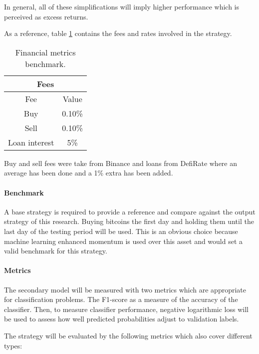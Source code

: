 In general, all of these simplifications will imply higher performance which is
perceived as excess returns.

As a reference, table \ref{table:benchmark_fees} contains the fees and rates involved in the strategy.

\begin{table}[H]
  \centering
  \begin{tabular}{| c | c |} 
    \hline
    \multicolumn{2}{|c|}{Fees} \\
    \hline
    Fee & Value \\
    \hline
    Buy & 0.10\% \\
    \hline
    Sell & 0.10\% \\
    \hline
    Loan interest & 5\% \\
    \hline
  \end{tabular}
  \caption{Financial metrics benchmark.}
  \label{table:benchmark_fees}
\end{table}

Buy and sell fees were take from Binance \cite{binance_fees} and loans from 
DefiRate \cite{defi_rate_loans} where an average has been done and a 1\% extra
has been added.

\paragraph{Benchmark} A base strategy is required to provide a reference and
compare against the output strategy of this research. Buying bitcoins the first
day and holding them until the last day of the testing period will be used. This
is an obvious choice because machine learning enhanced momentum is used over this
asset and would set a valid benchmark for this strategy.

\paragraph{Metrics} The secondary model will be measured with two metrics which
are appropriate for classification problems. The F1-score as a measure of the 
accuracy of the classifier. Then, to measure classifier performance, negative
logarithmic loss will be used to assess how well predicted probabilities adjust
to validation labels.

The strategy will be evaluated by the following metrics which also cover different
types:

